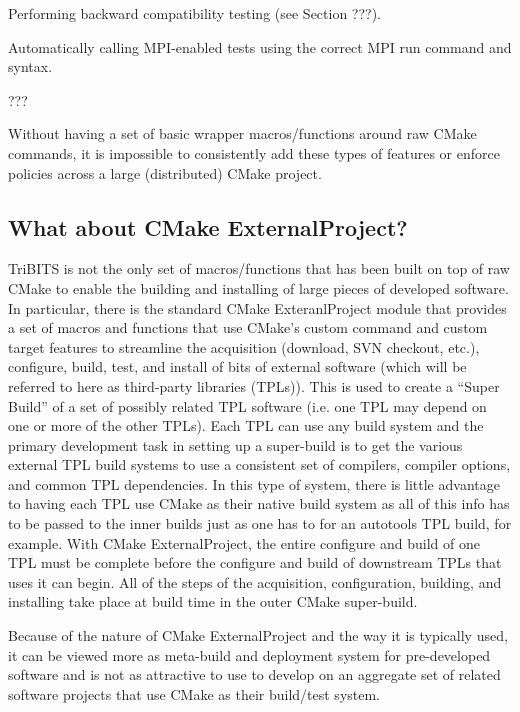 \documentclass[note]{TechNote}
\begin{document}
\begin{compactitem}
\item Performing backward compatibility testing (see Section ???).
\item Automatically calling MPI-enabled tests using the correct MPI run command and syntax.
\item ???
\end{compactitem}

Without having a set of basic wrapper macros/functions around raw CMake commands, it is impossible to consistently add these types of features or enforce policies across a large (distributed) CMake project.

%
\subsection{What about CMake ExternalProject?}
\label{sec:what_about_cmake_externalproject}
%

TriBITS is not the only set of macros/functions that has been built on top of raw CMake to enable the building and installing of large pieces of developed software.  In particular, there is the standard CMake ExteranlProject module that provides a set of macros and functions that use CMake's custom command and custom target features to streamline the acquisition (download, SVN checkout, etc.), configure, build, test, and install of bits of external software (which will be referred to here as third-party libraries (TPLs)).  This is used to create a ``Super Build'' of a set of possibly related TPL software (i.e. one TPL may depend on one or more of the other TPLs).  Each TPL can use any build system and the primary development task in setting up a super-build is to get the various external TPL build systems to use a consistent set of compilers, compiler options, and common TPL dependencies.  In this type of system, there is little advantage to having each TPL use CMake as their native build system as all of this info has to be passed to the inner builds just as one has to for an autotools TPL build, for example.  With CMake ExternalProject, the entire configure and build of one TPL must be complete before the configure and build of downstream TPLs that uses it can begin.  All of the steps of the acquisition, configuration, building, and installing take place at build time in the outer CMake super-build.

Because of the nature of CMake ExternalProject and the way it is typically used, it can be viewed more as meta-build and deployment system for pre-developed software and is not as attractive to use to develop on an aggregate set of related software projects that use CMake as their build/test system.
\end{document}
